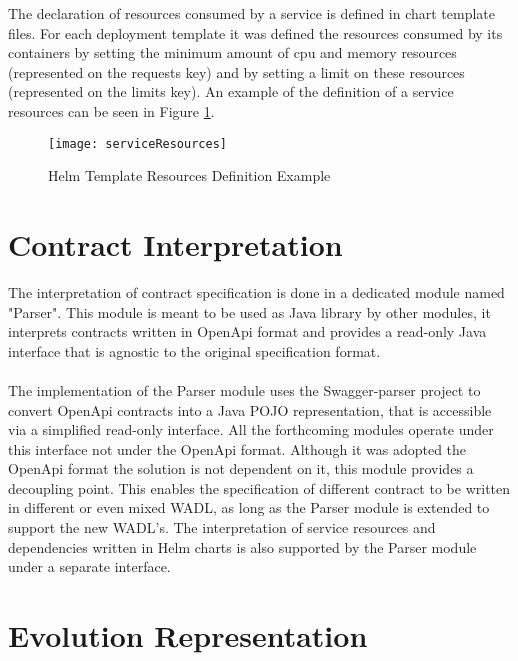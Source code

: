 \newpage

The declaration of resources consumed by a service is defined in chart template files.
For each deployment template it was defined the resources consumed by its containers by
setting the minimum amount of cpu and memory resources (represented on the requests key) and by setting a limit on these resources (represented on the limits key).
An example of the definition of a service resources can be seen in Figure \ref{fig:serviceResources}.

\begin{figure}[htbp]
    \centering
    \texttt{[image: serviceResources]}
    \caption{Helm Template Resources Definition Example}
    \label{fig:serviceResources}
\end{figure}

\section{Contract Interpretation} %
\label{sec:contract_interpretation}

The interpretation of contract specification is done in a dedicated module named "Parser".
This module is meant to be used as Java library by other modules,
it interprets contracts written in OpenApi format and provides a read-only Java interface
that is agnostic to the original specification format.

\paragraph{}

The implementation of the Parser module uses the Swagger-parser project \cite{swaggerparser} to convert OpenApi contracts into a Java POJO representation, that is accessible via a simplified read-only interface.
All the forthcoming modules operate under this interface not under the OpenApi format.
Although it was adopted the OpenApi format the solution is not dependent on it, this module provides a decoupling point.
This enables the specification of different contract to be written in different or even mixed WADL,
as long as the Parser module is extended to support the new WADL's.
The interpretation of service resources and dependencies written in Helm charts is also supported by the Parser module under a separate interface.

\newpage

\section{Evolution Representation} %
\label{sec:evolution_representation}

